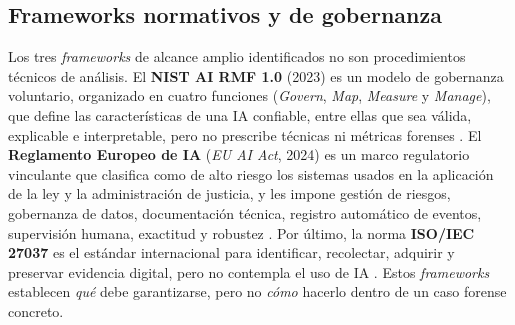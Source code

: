 \documentclass[journal]{IEEEtran}
\begin{document}
\subsection{Frameworks normativos y de gobernanza}
Los tres \textit{frameworks} de alcance amplio identificados no son procedimientos técnicos de análisis. El \textbf{NIST AI RMF 1.0} (2023) es un modelo de gobernanza voluntario, organizado en cuatro funciones (\textit{Govern}, \textit{Map}, \textit{Measure} y \textit{Manage}), que define las características de una IA confiable, entre ellas que sea válida, explicable e interpretable, pero no prescribe técnicas ni métricas forenses \cite{NIST_AI_RMF_2023}. El \textbf{Reglamento Europeo de IA} (\textit{EU AI Act}, 2024) es un marco regulatorio vinculante que clasifica como de alto riesgo los sistemas usados en la aplicación de la ley y la administración de justicia, y les impone gestión de riesgos, gobernanza de datos, documentación técnica, registro automático de eventos, supervisión humana, exactitud y robustez \cite{EU_AI_Act_2024}. Por último, la norma \textbf{ISO/IEC 27037} es el estándar internacional para identificar, recolectar, adquirir y preservar evidencia digital, pero no contempla el uso de IA \cite{ISO_27037}. Estos \textit{frameworks} establecen \textit{qué} debe garantizarse, pero no \textit{cómo} hacerlo dentro de un caso forense concreto.
\end{document}
